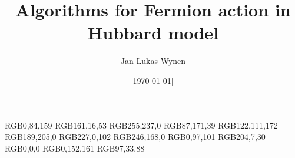 
\usepackage[a4paper,
            vdivide={3.3cm,,3.3cm},
            hdivide={2cm,,2cm}
            ]{geometry}

\usepackage{ucs}                %
\usepackage[utf8x]{inputenc}
\usepackage[T1]{fontenc}
\usepackage[english]{babel}

\usepackage{amsmath}
\usepackage{amsfonts}
\usepackage{amssymb}
\usepackage{amsthm}
\usepackage{mathtools}
\usepackage{commath}            %
\usepackage{bm}                 %
\usepackage{dsfont}

\usepackage{datetime}
\usepackage{authblk}
\usepackage{picinpar}           %
\usepackage{graphics}           %
\usepackage{float}              %
\usepackage{caption}
\usepackage{subcaption}
\usepackage{cite}
\usepackage{placeins}           %
\usepackage[dvipsnames,hyperref]{xcolor}
\usepackage[colorinlistoftodos]{todonotes}
\usepackage[pdftex, ocgcolorlinks]{hyperref}
\usepackage{cleveref}


\newcommand{\theauthor}{Jan-Lukas Wynen}
\newcommand{\theinstitute}{IAS-4}
\newcommand{\thetitle}{Algorithms for Fermion action in Hubbard model}
\newcommand{\thedate}{\isodate\today}


\author[1]{\theauthor}

\title{\thetitle}
\date{\thedate|\currenttime}

\definecolor{rwthblau}     {RGB}{0,84,159}
\definecolor{rwthbordeaux} {RGB}{161,16,53}
\definecolor{rwthgelb}     {RGB}{255,237,0}
\definecolor{rwthgrun}     {RGB}{87,171,39}
\definecolor{rwthlila}     {RGB}{122,111,172}
\definecolor{rwthmaigrun}  {RGB}{189,205,0}
\definecolor{rwthmagenta}  {RGB}{227,0,102}
\definecolor{rwthorange}   {RGB}{246,168,0}
\definecolor{rwthpetrol}   {RGB}{0,97,101}
\definecolor{rwthrot}      {RGB}{204,7,30}
\definecolor{rwthschwarz}  {RGB}{0,0,0}
\definecolor{rwthturkis}   {RGB}{0,152,161}
\definecolor{rwthviolett}  {RGB}{97,33,88}

